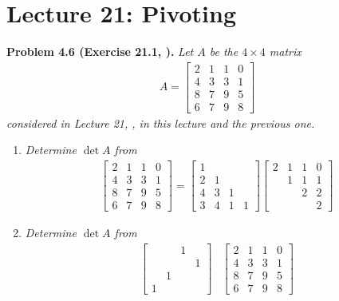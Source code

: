 \documentclass[a4paper,oneside]{book}
\numberwithin{equation}{chapter}
\begin{document}
\section{Lecture 21: Pivoting}
\textbf{Problem 4.6 (Exercise 21.1, \cite{1}).} \textit{Let $A$ be the $4\times 4$ matrix}
\begin{align}
A = \left[ {\begin{array}{*{20}{c}}
2&1&1&0\\
4&3&3&1\\
8&7&9&5\\
6&7&9&8
\end{array}} \right]
\end{align}
\textit{considered in Lecture 21, \cite{1}, in this lecture and the previous one.}
\begin{enumerate}
\item \textit{Determine $\det A$ from}
\begin{align}
\left[ {\begin{array}{*{20}{c}}
2&1&1&0\\
4&3&3&1\\
8&7&9&5\\
6&7&9&8
\end{array}} \right] = \left[ {\begin{array}{*{20}{c}}
1&{}&{}&{}\\
2&1&{}&{}\\
4&3&1&{}\\
3&4&1&1
\end{array}} \right]\left[ {\begin{array}{*{20}{c}}
2&1&1&0\\
{}&1&1&1\\
{}&{}&2&2\\
{}&{}&{}&2
\end{array}} \right]
\end{align}
\item \textit{Determine $\det A$ from}
\begin{align}
\left[ {\begin{array}{*{20}{c}}
{}&{}&1&{}\\
{}&{}&{}&1\\
{}&1&{}&{}\\
1&{}&{}&{}
\end{array}} \right]& \left[ {\begin{array}{*{20}{c}}
2&1&1&0\\
4&3&3&1\\
8&7&9&5\\
6&7&9&8
\end{array}} \right] \\

\end{align}
\end{enumerate}
\end{document}
